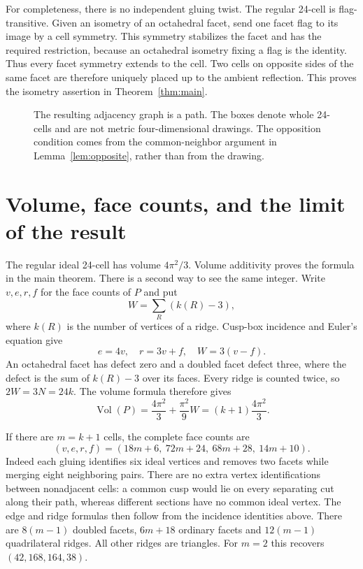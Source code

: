 \documentclass[11pt]{article}
\theoremstyle{remark}
\newcommand{\Vol}{\operatorname{Vol}}
\newcommand{\CELL}{\mathcal C}
\begin{document}
For completeness, there is no independent gluing twist. The
regular 24-cell is flag-transitive. Given an isometry of an
octahedral facet, send one facet flag to its image by a cell
symmetry. This symmetry stabilizes the facet and has the required
restriction, because an octahedral isometry fixing a flag is the
identity. Thus every facet symmetry extends to the cell.
Two cells on opposite sides of the same facet are therefore
uniquely placed up to the ambient reflection. This proves the
isometry assertion in Theorem~\ref{thm:main}.

\begin{figure}[htbp]
\centering
{}
\caption{The resulting adjacency graph is a path. The boxes denote
whole 24-cells and are not metric four-dimensional drawings. The
opposition condition comes from the common-neighbor argument in
Lemma~\ref{lem:opposite}, rather than from the drawing.}
\label{fig:chain}
\end{figure}

\section{Volume, face counts, and the limit of the result}

The regular ideal 24-cell has volume $4\pi^2/3$.
Volume additivity proves the formula in the main theorem. There
is a second way to see the same integer. Write $v,e,r,f$ for
the face counts of $P$ and put
\[
 W=\sum_{R}(k(R)-3),
\]
where $k(R)$ is the number of vertices of a ridge. Cusp-box
incidence and Euler's equation give
\[
 e=4v,\quad r=3v+f,\quad W=3(v-f).
\]
An octahedral facet has defect zero and a doubled facet defect
three, where the defect is the sum of $k(R)-3$ over its faces.
Every ridge is counted twice, so $2W=3N=24k$. The volume formula
\cite[Lemma~2]{Kolpakov} therefore gives
\[
 \Vol(P)=\frac{4\pi^2}{3}+\frac{\pi^2}{9}W
 =(k+1)\frac{4\pi^2}{3}.
\]

If there are $m=k+1$ cells, the complete face counts are
\[
 (v,e,r,f)=(18m+6,\ 72m+24,\ 68m+28,\ 14m+10).
\]
Indeed each gluing identifies six ideal vertices and removes two
facets while merging eight neighboring pairs. There are no extra
vertex identifications between nonadjacent cells: a common cusp
would lie on every separating cut along their path, whereas
different sections have no common ideal vertex. The edge and
ridge formulas then follow from the incidence identities above.
There are $8(m-1)$ doubled facets, $6m+18$ ordinary facets and
$12(m-1)$ quadrilateral ridges. All other ridges are triangles.
For $m=2$ this recovers $(42,168,164,38)$.
\end{document}
